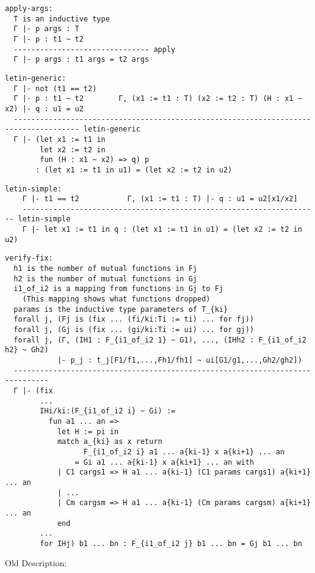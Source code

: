 \documentclass[a4paper,fleqn]{article}
\begin{document}
\begin{verbatim}
apply-args:
  T is an inductive type
  Γ |- p args : T
  Γ |- p : t1 ~ t2
  ------------------------------- apply
  Γ |- p args : t1 args = t2 args
\end{verbatim}

\begin{verbatim}
letin-generic:
  Γ |- not (t1 == t2)
  Γ |- p : t1 ~ t2        Γ, (x1 := t1 : T) (x2 := t2 : T) (H : x1 ~ x2) |- q : u1 = u2
  ------------------------------------------------------------------------------------- letin-generic
  Γ |- (let x1 := t1 in
        let x2 := t2 in
        fun (H : x1 ~ x2) => q) p
       : (let x1 := t1 in u1) = (let x2 := t2 in u2)
\end{verbatim}

\begin{verbatim}
letin-simple:
    Γ |- t1 == t2           Γ, (x1 := t1 : T) |- q : u1 = u2[x1/x2]
    -------------------------------------------------------------------- letin-simple
    Γ |- let x1 := t1 in q : (let x1 := t1 in u1) = (let x2 := t2 in u2)
\end{verbatim}


\begin{verbatim}
verify-fix:
  h1 is the number of mutual functions in Fj
  h2 is the number of mutual functions in Gj
  i1_of_i2 is a mapping from functions in Gj to Fj
    (This mapping shows what functions dropped)
  params is the inductive type parameters of T_{ki}
  forall j, (Fj is (fix ... (fi/ki:Ti := ti) ... for fj))
  forall j, (Gj is (fix ... (gi/ki:Ti := ui) ... for gj))
  forall j, (Γ, (IH1 : F_{i1_of_i2 1} ~ G1), ..., (IHh2 : F_{i1_of_i2 h2} ~ Gh2)
            |- p_j : t_j[F1/f1,...,Fh1/fh1] ~ ui[G1/g1,...,Gh2/gh2])
  ------------------------------------------------------------------------------
  Γ |- (fix
        ...
        IHi/ki:(F_{i1_of_i2 i} ~ Gi) :=
          fun a1 ... an =>
            let H := pi in
            match a_{ki} as x return
                  F_{i1_of_i2 i} a1 ... a{ki-1} x a{ki+1} ... an
                = Gi a1 ... a{ki-1} x a{ki+1} ... an with
            | C1 cargs1 => H a1 ... a{ki-1} (C1 params cargs1) a{ki+1} ... an
            | ...
            | Cm cargsm => H a1 ... a{ki-1} (Cm params cargsm) a{ki+1} ... an
            end
        ...
        for IHj) b1 ... bn : F_{i1_of_i2 j} b1 ... bn = Gj b1 ... bn
\end{verbatim}





Old Description:
\end{document}
